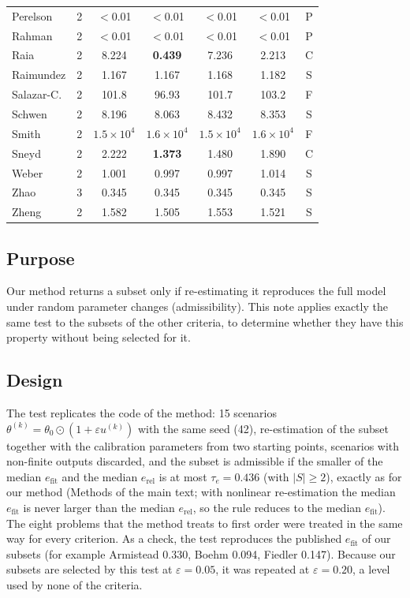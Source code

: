 \begin{table}[H]
\begin{tabular}{@{}lrccccc@{}}
Perelson     & 2  & $<$0.01 & $<$0.01 & $<$0.01 & $<$0.01 & P \\
Rahman       & 2  & $<$0.01 & $<$0.01 & $<$0.01 & $<$0.01 & P \\
Raia         & 2  & 8.224 & \textbf{0.439} & 7.236 & 2.213 & C \\
Raimundez    & 2  & 1.167 & 1.167 & 1.168 & 1.182 & S \\
Salazar-C.   & 2  & 101.8 & 96.93 & 101.7 & 103.2 & F \\
Schwen       & 2  & 8.196 & 8.063 & 8.432 & 8.353 & S \\
Smith        & 2  & $1.5\times10^4$ & $1.6\times10^4$ & $1.5\times10^4$ & $1.6\times10^4$ & F \\
Sneyd        & 2  & 2.222 & \textbf{1.373} & 1.480 & 1.890 & C \\
Weber        & 2  & 1.001 & 0.997 & 0.997 & 1.014 & S \\
Zhao         & 3  & 0.345 & 0.345 & 0.345 & 0.345 & S \\
Zheng        & 2  & 1.582 & 1.505 & 1.553 & 1.521 & S \\
\bottomrule
\end{tabular}
\end{table}


\subsection*{Purpose}
Our method returns a subset only if re-estimating it reproduces the full model under random parameter changes (admissibility). This note applies exactly the same test to the subsets of the other criteria, to determine whether they have this property without being selected for it.

\subsection*{Design}
The test replicates the code of the method: 15 scenarios $\theta^{(k)}=\theta_0\odot(1+\varepsilon u^{(k)})$ with the same seed (42), re-estimation of the subset together with the calibration parameters from two starting points, scenarios with non-finite outputs discarded, and the subset is admissible if the smaller of the median $e_{\mathrm{fit}}$ and the median $e_{\mathrm{rel}}$ is at most $\tau_e=0.436$ (with $|S|\ge2$), exactly as for our method (Methods of the main text; with nonlinear re-estimation the median $e_{\mathrm{fit}}$ is never larger than the median $e_{\mathrm{rel}}$, so the rule reduces to the median $e_{\mathrm{fit}}$). The eight problems that the method treats to first order were treated in the same way for every criterion. As a check, the test reproduces the published $e_{\mathrm{fit}}$ of our subsets (for example Armistead 0.330, Boehm 0.094, Fiedler 0.147). Because our subsets are selected by this test at $\varepsilon=0.05$, it was repeated at $\varepsilon=0.20$, a level used by none of the criteria.

